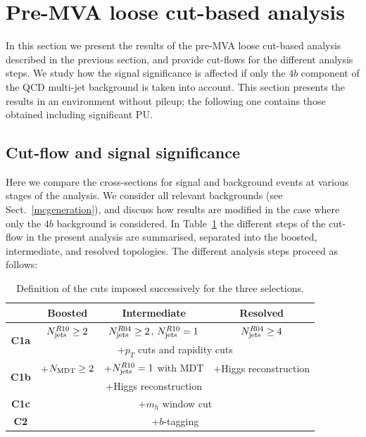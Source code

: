 \section{Pre-MVA loose cut-based analysis}

\label{sec:results}

In this section we present the results of the pre-MVA
loose cut-based analysis described in the previous section, and provide 
cut-flows for the different analysis steps.
%
We study how the signal significance
is affected if only the $4b$ component of the
QCD multi-jet background is taken into account.
%
This section presents the results in an environment
without pileup; the following one contains those
obtained including significant PU.

\subsection{Cut-flow and signal significance}

Here we compare the cross-sections for
signal and background events at various
stages of the analysis.
%
We consider all relevant backgrounds (see Sect.~\ref{mcgeneration}),
and discuss how results are modified in the case where only the $4b$
background is considered.
%
In Table~\ref{tab:cutflowdetails}
the different
steps of the cut-flow in the present analysis are summarised,
separated into the boosted, intermediate,
    and resolved topologies.
    The different analysis steps proceed as follows:
   
\begin{table}[t]
  \centering
  \begin{tabular}{|c|c|c|c|}
\hline
&  Boosted  &   Intermediate &  Resolved  \\
\hline
\hline
\multirow{2}{*}{{\bf C1a}} & $N_{\rm jets}^{R10}\ge 2$ & $N_{\rm jets}^{R04}\ge 2$, $N_{\rm jets}^{R10}=1$  &
$N_{\rm jets}^{R04}\ge 4$ \\
 & \multicolumn{3}{c|}{+$p_T$ cuts and rapidity cuts} \\
\hline
\multirow{2}{*}{{\bf C1b}} & +$N_{\rm MDT}\ge 2$ & +$N_{\rm jets}^{R10}=1$ with MDT  &
 +Higgs reconstruction \\
  &  &
 +Higgs reconstruction  & \\
 \hline
{\bf C1c} & \multicolumn{3}{c|}{ +$m_h$ window cut} \\
\hline
{\bf C2} & \multicolumn{3}{c|}{+$b$-tagging}    \\
\hline
  \end{tabular}
  \caption{\small Definition of the cuts imposed successively for the three selections.
      \label{tab:cutflowdetails}
  }
\end{table}

